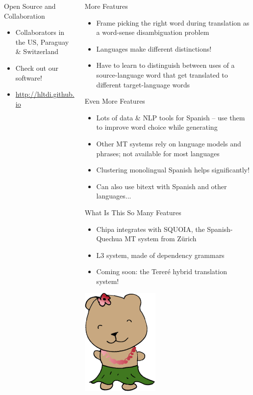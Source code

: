 \documentclass[final]{beamer}
\begin{document}
\begin{frame}{}
\begin{columns}[t]
\begin{column}{.32\linewidth}
  \begin{block}{\large Open Source and Collaboration}
    \centering
    \begin{itemize}
    \item Collaborators in the US, Paraguay \& Switzerland
    \item Check out our software!
    \item \url{http://hltdi.github.io}
    \end{itemize}
  \end{block}


  \end{column}

  \begin{column}{.32\linewidth}
  \vfill
  \begin{block}{\large More Features}
    \begin{itemize}
    \item Frame picking the right word during translation as a word-sense disambiguation problem
    \item Languages make different distinctions!
    \item Have to learn to distinguish between uses of a source-language word
    that get translated to different target-language words
    \end{itemize}
  \end{block}

  \begin{block}{\large Even More Features}
    \begin{itemize}
    \item Lots of data \& NLP tools for Spanish -- use them
    to improve word choice while generating 
    \item Other MT systems rely on language models and phrases; not available
    for most languages
    \item Clustering monolingual Spanish helps significantly!
    \item Can also use bitext with Spanish and other languages...
    \end{itemize}
  \end{block}


  \begin{block}{\large What Is This So Many Features}
    \centering
    \begin{itemize}
    \item Chipa integrates with SQUOIA, the Spanish-Quechua MT system from Zürich
    \item L3 system, made of dependency grammars
    \item Coming soon: the Tereré hybrid translation system!
    \end{itemize}
  \end{block}
  \hfill
  \includegraphics[width=.15\linewidth]{hltdi-logo-small.png}



\end{column}
\end{columns}
\end{frame}
\end{document}
